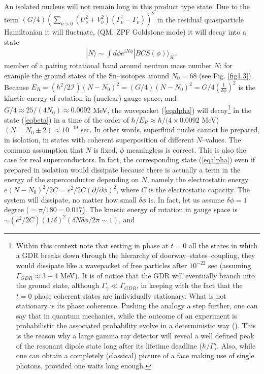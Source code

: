 An isolated nucleus will not remain long in this product type state. Due to the term $(G/4)\left(\sum_{\nu>0}\left(U^2_\nu+V^2_\nu\right)\left(\Gamma_\nu^\dagger-\Gamma_\nu\right)\right)^2$ in the residual quasiparticle Hamiltonian it will fluctuate, (QM, ZPF Goldstone mode) it will decay into a state
\begin{align}\label{eqbeta}
|N\rangle \sim \int d\phi e^{iN\phi}|BCS(\phi)\rangle_{\mathcal{K}},
\end{align}
member of a pairing rotational band around neutron mass number $N$: for example the ground states of the Sn--isotopes around $N_0=68$ (see Fig. \ref{fig1.3}). Because $E_R=(\hbar^2/2\mathcal I)(N-N_0)^2=(G/4)(N-N_0)^2=G/4(\tfrac{1}{\delta \phi})^2$ is the kinetic energy of rotation in (nuclear) gauge space, and $G/4\approx 25/(4 N_0)\approx 0.0092$ MeV, the wavepacket (\ref{eqalpha}) will decay\footnote{Within this context note that setting in phase at $t=0$ all the states in which a GDR breaks down through the hierarchy of doorway--states--coupling, they would dissipate like a wavepacket of free particles after $10^{-22}$ sec (assuming $\Gamma_{GDR}\approx 3-4$ MeV). It is of notice that the GDR will eventually branch into the ground state, although $\Gamma_{\gamma}\ll\Gamma_{GDR}$, in keeping with the fact that the $t=0$ phase coherent states are individually stationary. What is not stationary is its phase coherence. Pushing the analogy a step further, one can say that in quantum mechanics, while the outcome of an experiment is probabilistic the associated probability evolve in a deterministic way (\cite{Born:26}). This is the reason why a large gamma ray detector will reveal a well defined peak of the resonant dipole state long after its  lifetime deadline ($\hbar/\Gamma$). Also, while one can obtain a completely (classical) picture of a face making use of single photons, provided one waits long enough.} in the state (\ref{eqbeta}) in a time of the order of $\hbar/E_R\approx\hbar/(4\times 0.0092$ MeV) $(N=N_0\pm2)\approx 10^{-19}$ sec. In other words, superfluid nuclei cannot be prepared, in isolation, in states with coherent superposition of different $N$--values. The common assumption that $N$ is fixed, $\phi$ meaningless is correct. This is also the case for real superconductors. In fact, the corresponding state (\ref{eqalpha}) even if prepared in isolation would dissipate because there is actually a term in the energy of the superconductor depending on $N$, namely the electrostatic energy $e(N-N_0)^2/2C=e^2/2C(\partial/\partial \phi)^2$, where $C$ is the electrostatic capacity. The system will dissipate, no matter how small $\delta \phi$ is. In fact, let us assume $\delta \phi=1$ degree ($=\pi/180=0.017$). The kinetic energy of rotation in gauge space is $\sim (e^2/2C)(1/\delta)^2 (\delta N\delta\phi/2\pi\sim 1)$, and 
